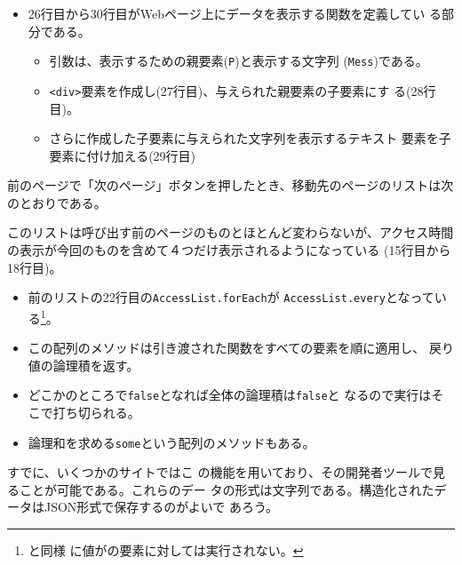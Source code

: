 \begin{Exec}
\begin{itemize}
\begin{itemize}
\end{itemize}
	\item 26行目から30行目がWebページ上にデータを表示する関数を定義してい
				る部分である。
				\begin{itemize}
				 \item 引数は、表示するための親要素(\texttt{P})と表示する文字列
							 (\texttt{Mess})である。
				 \item \texttt{<div>}要素を作成し(27行目)、与えられた親要素の子要素にす
							 る(28行目)。
				 \item さらに作成した子要素に与えられた文字列を表示するテキスト
							 要素を子要素に付け加える(29行目)
				\end{itemize}
				
 \end{itemize}
前のページで「次のページ」ボタンを押したとき、移動先のページのリストは次
 のとおりである。
\end{Exec}
このリストは呼び出す前のページのものとほとんど変わらないが、アクセス時間
の表示が今回のものを含めて４つだけ表示されるようになっている
(15行目から18行目)。
\begin{itemize}
 \item 前のリストの22行目の\Verb+AccessList.forEach+が
			 \Verb+AccessList.every+となっている\footnote{と同様
			 に値がの要素に対しては実行されない。}。
 \item この配列のメソッドは引き渡された関数をすべての要素を順に適用し、
			 戻り値の論理積を返す。
 \item どこかのところで\Verb+false+となれば全体の論理積は\Verb+false+と
			 なるので実行はそこで打ち切られる。
 \item 論理和を求める\Verb+some+という配列のメソッドもある。
\end{itemize}

すでに、いくつかのサイトではこ
の機能を用いており、その開発者ツールで見ることが可能である。これらのデー
タの形式は文字列である。構造化されたデータはJSON形式で保存するのがよいで
あろう。

